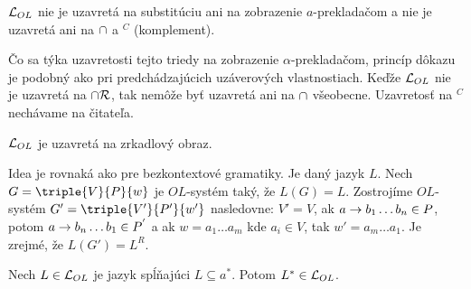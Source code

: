 \begin{dosledok}
  $\mathcal{L}_{OL}$ nie je uzavretá na substitúciu ani na
  zobrazenie $a$-prekladačom a nie je uzavretá ani na $\cap$ a
  $^{C}$ (komplement).
\end{dosledok}

\begin{dokaz}
  Čo sa týka uzavretosti tejto triedy na zobrazenie $\alpha$-prekladačom,
  princíp dôkazu je podobný ako pri predchádzajúcich uzáverových
  vlastnostiach. Keďže $\mathcal{L}_{OL}$ nie je uzavretá na
  $\cap \mathcal{R}$, tak nemôže byť uzavretá ani na $\cap$
  všeobecne. Uzavretosť na $^{C}$ nechávame na čitateľa.
\end{dokaz}


\begin{veta}
  $\mathcal{L}_{OL}$ je uzavretá na zrkadlový obraz.
\end{veta}

\begin{dokaz}
  Idea je rovnaká ako pre bezkontextové gramatiky. Je daný jazyk $L$.
  Nech $G = \triple{V}{P}{w}$ je $OL$-systém taký, že $L(G) = L$.
  Zostrojíme $OL$-systém $G' = \triple{V'}{P'}{w'}$ nasledovne:
  $V' = V$, ak ${a \rightarrow b_1 \dots b_n} \in P$,
  potom ${a \rightarrow b_n \dots b_1} \in P^{'}$ a ak
  $w = a_1 \dots a_m$ kde $a_i \in V$,
  tak $w' = a_m \dots a_1$. Je zrejmé, že $L(G') = L^{R}$.
\end{dokaz}


\begin{veta}
  Nech $L \in \mathcal{L}_{OL}$ je jazyk spĺňajúci $L \subseteq a^{*}$.
  Potom $L^{*} \in \mathcal{L}_{OL}$.
\end{veta}


